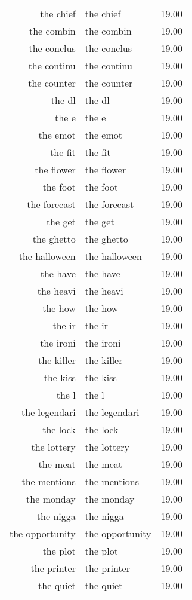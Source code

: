 \begin{table}[ht]
\begin{tabular}{rlr}
  the chief & the chief & 19.00 \\ 
  the combin & the combin & 19.00 \\ 
  the conclus & the conclus & 19.00 \\ 
  the continu & the continu & 19.00 \\ 
  the counter & the counter & 19.00 \\ 
  the dl & the dl & 19.00 \\ 
  the e & the e & 19.00 \\ 
  the emot & the emot & 19.00 \\ 
  the fit & the fit & 19.00 \\ 
  the flower & the flower & 19.00 \\ 
  the foot & the foot & 19.00 \\ 
  the forecast & the forecast & 19.00 \\ 
  the get & the get & 19.00 \\ 
  the ghetto & the ghetto & 19.00 \\ 
  the halloween & the halloween & 19.00 \\ 
  the have & the have & 19.00 \\ 
  the heavi & the heavi & 19.00 \\ 
  the how & the how & 19.00 \\ 
  the ir & the ir & 19.00 \\ 
  the ironi & the ironi & 19.00 \\ 
  the killer & the killer & 19.00 \\ 
  the kiss & the kiss & 19.00 \\ 
  the l & the l & 19.00 \\ 
  the legendari & the legendari & 19.00 \\ 
  the lock & the lock & 19.00 \\ 
  the lottery & the lottery & 19.00 \\ 
  the meat & the meat & 19.00 \\ 
  the mentions & the mentions & 19.00 \\ 
  the monday & the monday & 19.00 \\ 
  the nigga & the nigga & 19.00 \\ 
  the opportunity & the opportunity & 19.00 \\ 
  the plot & the plot & 19.00 \\ 
  the printer & the printer & 19.00 \\ 
  the quiet & the quiet & 19.00 \\ 

\end{tabular}
\end{table}
